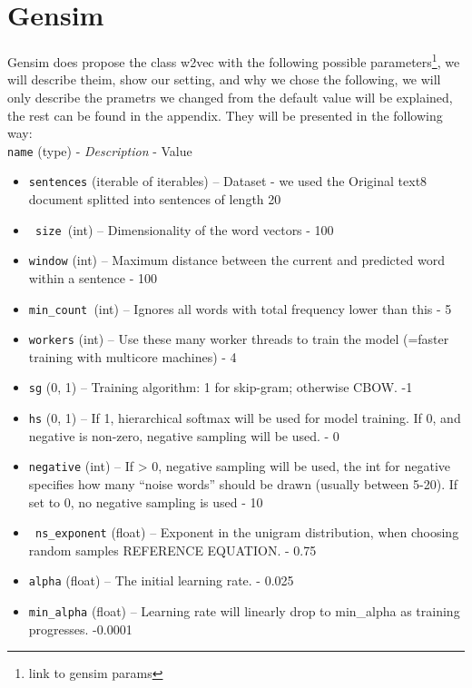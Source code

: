 \section{Gensim}
Gensim does propose the class w2vec with the following possible parameters\footnote{link to gensim params}, we will describe theim, show our setting, and why we chose the following, we will only describe the prametrs we changed from the default value will be explained, the rest can be found in the appendix. 
They will be presented in the following way: \\
\texttt{name} (type) - \textit{Description} - Value
\begin{itemize}

   \item \texttt{sentences} (iterable of iterables) – Dataset - we used the Original text8 document splitted into sentences of length 20
  \item \texttt{ size }(int) – Dimensionality of the word vectors - 100
\item    \texttt{window} (int) – Maximum distance between the current and predicted word within a sentence - 100
  \item  \texttt{min\_count }(int) – Ignores all words with total frequency lower than this - 5
 \item   \texttt{workers} (int) – Use these many worker threads to train the model (=faster training with multicore machines) - 4 
\item    \texttt{sg} ({0, 1}) – Training algorithm: 1 for skip-gram; otherwise CBOW. -1
  \item  \texttt{hs} ({0, 1}) – If 1, hierarchical softmax will be used for model training. If 0, and negative is non-zero, negative sampling will be used. - 0
  \item  \texttt{negative} (int) – If > 0, negative sampling will be used, the int for negative specifies how many “noise words” should be drawn (usually between 5-20). If set to 0, no negative sampling is used - 10 
\item   \texttt{ ns\_exponent} (float) – Exponent in the unigram distribution, when choosing random samples REFERENCE EQUATION. - 0.75
\item    \texttt{alpha} (float) – The initial learning rate. - 0.025
 \item   \texttt{min\_alpha} (float) – Learning rate will linearly drop to min\_alpha as training progresses. -0.0001


\end{itemize}
